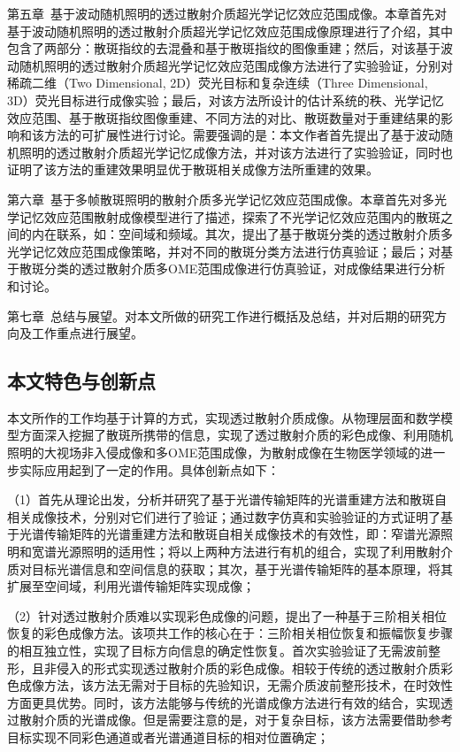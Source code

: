 第五章\  基于波动随机照明的透过散射介质超光学记忆效应范围成像。本章首先对基于波动随机照明的透过散射介质超光学记忆效应范围成像原理进行了介绍，其中包含了两部分：散斑指纹的去混叠和基于散斑指纹的图像重建；然后，对该基于波动随机照明的透过散射介质超光学记忆效应范围成像方法进行了实验验证，分别对稀疏二维（Two Dimensional, 2D）荧光目标和复杂连续（Three Dimensional, 3D）荧光目标进行成像实验；最后，对该方法所设计的估计系统的秩、光学记忆效应范围、基于散斑指纹图像重建、不同方法的对比、散斑数量对于重建结果的影响和该方法的可扩展性进行讨论。需要强调的是：本文作者首先提出了基于波动随机照明的透过散射介质超光学记忆成像方法，并对该方法进行了实验验证，同时也证明了该方法的重建效果明显优于散斑相关成像方法所重建的效果。

第六章\ 基于多帧散斑照明的散射介质多光学记忆效应范围成像。本章首先对多光学记忆效应范围散射成像模型进行了描述，探索了不光学记忆效应范围内的散斑之间的内在联系，如：空间域和频域。其次，提出了基于散斑分类的透过散射介质多光学记忆效应范围成像策略，并对不同的散斑分类方法进行仿真验证；最后；对基于散斑分类的透过散射介质多OME范围成像进行仿真验证，对成像结果进行分析和讨论。

第七章\ 总结与展望。对本文所做的研究工作进行概括及总结，并对后期的研究方向及工作重点进行展望。

\subsection{本文特色与创新点}

本文所作的工作均基于计算的方式，实现透过散射介质成像。从物理层面和数学模型方面深入挖掘了散斑所携带的信息，实现了透过散射介质的彩色成像、利用随机照明的大视场非入侵成像和多OME范围成像，为散射成像在生物医学领域的进一步实际应用起到了一定的作用。具体创新点如下：

（1）首先从理论出发，分析并研究了基于光谱传输矩阵的光谱重建方法和散斑自相关成像技术，分别对它们进行了验证；通过数字仿真和实验验证的方式证明了基于光谱传输矩阵的光谱重建方法和散斑自相关成像技术的有效性，即：窄谱光源照明和宽谱光源照明的适用性；将以上两种方法进行有机的组合，实现了利用散射介质对目标光谱信息和空间信息的获取；其次，基于光谱传输矩阵的基本原理，将其扩展至空间域，利用光谱传输矩阵实现成像；

（2）针对透过散射介质难以实现彩色成像的问题，提出了一种基于三阶相关相位恢复的彩色成像方法。该项共工作的核心在于：三阶相关相位恢复和振幅恢复步骤的相互独立性，实现了目标方向信息的确定性恢复。首次实验验证了无需波前整形，且非侵入的形式实现透过散射介质的彩色成像。相较于传统的透过散射介质彩色成像方法，该方法无需对于目标的先验知识，无需介质波前整形技术，在时效性方面更具优势。同时，该方法能够与传统的光谱成像方法进行有效的结合，实现透过散射介质的光谱成像。但是需要注意的是，对于复杂目标，该方法需要借助参考目标实现不同彩色通道或者光谱通道目标的相对位置确定；

